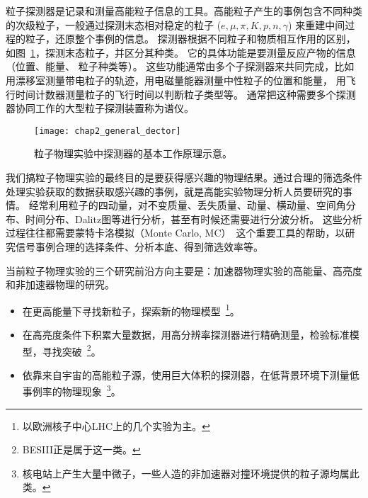 粒子探测器是记录和测量高能粒子信息的工具。高能粒子产生的事例包含不同种类的次级粒子，一般通过探测末态相对稳定的粒子 ($e,\mu,\pi,K,p,n,\gamma$) 来重建中间过程的粒子，还原整个事例的信息。
探测器根据不同粒子和物质相互作用的区别，如图~\ref{fig:tanceqi}，探测末态粒子，并区分其种类。
它的具体功能是要测量反应产物的信息（位置、能量、 粒子种类等）。
这些功能通常由多个子探测器来共同完成，比如用漂移室测量带电粒子的轨迹，用电磁量能器测量中性粒子的位置和能量，
用飞行时间计数器测量粒子的飞行时间以判断粒子类型等。
通常把这种需要多个探测器协同工作的大型粒子探测装置称为谱仪。
\begin{figure}
\begin{center}
\texttt{[image: chap2\_general\_dector]}
\caption{粒子物理实验中探测器的基本工作原理示意。}
\label{fig:tanceqi}
\end{center}
\end{figure}

我们搞粒子物理实验的最终目的是要获得感兴趣的物理结果。通过合理的筛选条件处理实验获取的数据获取感兴趣的事例，就是高能实验物理分析人员要研究的事情。
经常利用粒子的四动量，对不变质量、丢失质量、动量、横动量、空间角分布、时间分布、Dalitz图等进行分析，甚至有时候还需要进行分波分析。
这些分析过程往往都需要蒙特卡洛模拟（Monte Carlo, MC）~\cite{MC}这个重要工具的帮助，以研究信号事例合理的选择条件、分析本底、得到筛选效率等。

当前粒子物理实验的三个研究前沿方向主要是：加速器物理实验的高能量、高亮度和非加速器物理的研究。
\begin{itemize}
  \item 在更高能量下寻找新粒子，探索新的物理模型~\footnote{以欧洲核子中心LHC上的几个实验为主。}。
  \item 在高亮度条件下积累大量数据，用高分辨率探测器进行精确测量，检验标准模型，寻找突破~\footnote{BESIII正是属于这一类。}。
  \item 依靠来自宇宙的高能粒子源，使用巨大体积的探测器，在低背景环境下测量低事例率的物理现象~\footnote{核电站上产生大量中微子，一些人造的非加速器对撞环境提供的粒子源均属此类。}。
\end{itemize}

